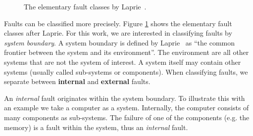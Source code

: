 \begin{figure}[!h]
  \caption{The elementary fault classes by Laprie~\cite{Laprie2004}.}
  \label{fig:faults}
\end{figure}

Faults can be classified more precisely. Figure \ref{fig:faults} shows the elementary fault classes after Laprie. For this work, we are interested in classifying faults by \emph{system boundary}. A system boundary is defined by Laprie~\cite{Laprie2004} as ``the common frontier between the system and its environment''. The environment are all other systems that are not the system of interest. A system itself may contain other systems (usually called sub-systems or components). When classifying faults, we separate between \textbf{internal} and \textbf{external} faults.

An \emph{internal} fault originates within the system boundary. To illustrate this with an example we take a computer as a system. Internally, the computer consists of many components as sub-systems. The failure of one of the components (e.g. the memory) is a fault within the system, thus an \emph{internal} fault.

